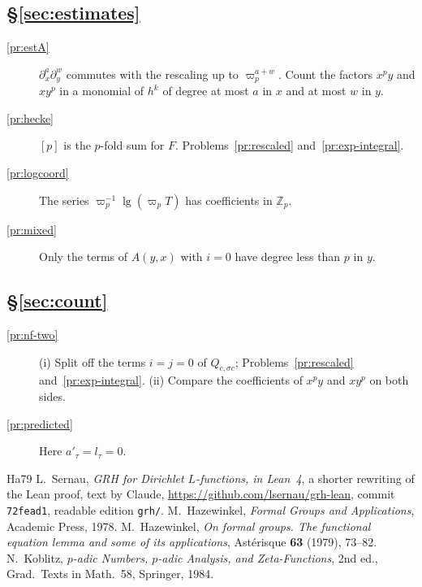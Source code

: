 \documentclass[reqno]{amsart}
\theoremstyle{definition}
\theoremstyle{plain}
\newcommand{\Z}{\mathbb{Z}}
\newcommand{\lgg}{\operatorname{lg}}
\begin{document}
\subsection*{\S\ref{sec:estimates}}
\begin{description}
\item[\ref{pr:estA}] \(\partial_x^a\partial_y^w\) commutes with the rescaling up to \(\varpi_p^{a+w}\).  Count the factors \(x^p y\) and \(x y^p\) in a monomial of \(h^k\) of degree at most \(a\) in \(x\) and at most \(w\) in \(y\).
\item[\ref{pr:hecke}] \([p]\) is the \(p\)-fold sum for \(F\).  Problems~\ref{pr:rescaled} and~\ref{pr:exp-integral}.
\item[\ref{pr:logcoord}] The series \(\varpi_p^{-1}\lgg(\varpi_p T)\) has coefficients in \(\Z_p\).
\item[\ref{pr:mixed}] Only the terms of \(A(y,x)\) with \(i = 0\) have degree less than \(p\) in \(y\).
\end{description}

\subsection*{\S\ref{sec:count}}
\begin{description}
\item[\ref{pr:nf-two}] (i) Split off the terms \(i = j = 0\) of \(Q_{c,\sigma c}\); Problems~\ref{pr:rescaled} and~\ref{pr:exp-integral}.  (ii) Compare the coefficients of \(x^p y\) and \(x y^p\) on both sides.
\item[\ref{pr:predicted}] Here \(a'_\tau = l_\tau = 0\).
\end{description}

\begin{thebibliography}{Ha79}
 L.~Sernau, \emph{GRH for Dirichlet \(L\)-functions, in Lean~4}, a shorter rewriting of the Lean proof, text by Claude, \url{https://github.com/lsernau/grh-lean}, commit \texttt{72fead1}, readable edition \texttt{grh/}.
 M.~Hazewinkel, \emph{Formal Groups and Applications}, Academic Press, 1978.
 M.~Hazewinkel, \emph{On formal groups.  The functional equation lemma and some of its applications}, Ast\'erisque \textbf{63} (1979), 73--82.
 N.~Koblitz, \emph{\(p\)-adic Numbers, \(p\)-adic Analysis, and Zeta-Functions}, 2nd ed., Grad.\ Texts in Math.\ 58, Springer, 1984.
\end{thebibliography}
\end{document}
